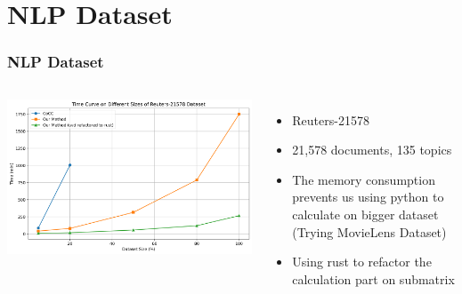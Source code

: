 \documentclass{beamer}
\begin{document}
\section{NLP Dataset}
\begin{frame}
    \frametitle{NLP Dataset}
    \begin{columns}
        \includegraphics[width=1.1\textwidth]{time_curve.png}
        \begin{itemize}
            \item Reuters-21578
            \item 21,578 documents, 135 topics
            \item The memory consumption prevents us using python to calculate on bigger dataset (Trying MovieLens Dataset)
            \item Using rust to refactor the calculation part on submatrix
        \end{itemize}
    \end{columns}
\end{frame}
\end{document}
